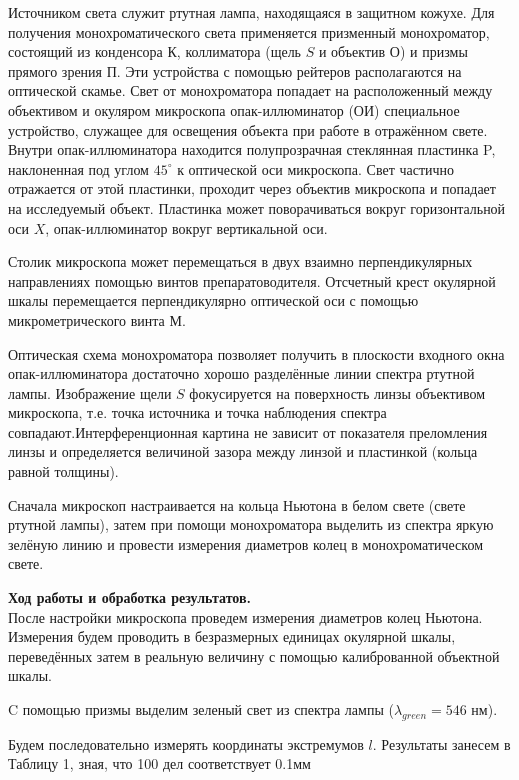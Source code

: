 \documentclass[a4paper, 12pt]{article}%
\begin{document}
Источником света служит ртутная лампа, находящаяся в защитном кожухе. Для получения монохроматического света применяется призменный монохроматор, состоящий из конденсора $ К $, коллиматора (щель $ S $ и объектив $ О $) и призмы прямого зрения $ П $. Эти устройства с помощью рейтеров располагаются на оптической скамье. Свет от монохроматора попадает на расположенный между объективом и окуляром микроскопа опак-иллюминатор (ОИ)  специальное устройство, служащее для освещения объекта при работе в отражённом свете. Внутри опак-иллюминатора находится полупрозрачная стеклянная пластинка P, наклоненная под углом $ 45^\circ $ к оптической оси микроскопа. Свет частично отражается от этой пластинки, проходит через объектив микроскопа и попадает на исследуемый объект. Пластинка может поворачиваться вокруг горизонтальной оси $ X $, опак-иллюминатор вокруг вертикальной оси.

Столик микроскопа может перемещаться в двух взаимно перпендикулярных направлениях помощью винтов препаратоводителя. Отсчетный крест окулярной шкалы перемещается перпендикулярно оптической оси с помощью микрометрического винта $ М $.

Оптическая схема монохроматора позволяет получить в плоскости входного окна опак-иллюминатора достаточно хорошо разделённые линии спектра ртутной лампы. Изображение щели $ S $ фокусируется на поверхность линзы объективом микроскопа, т.е. точка источника и точка наблюдения спектра совпадают.Интерференционная картина не зависит от показателя преломления линзы и определяется величиной зазора между линзой и пластинкой (кольца равной толщины).

Сначала микроскоп настраивается на кольца Ньютона в белом свете (свете ртутной лампы), затем при помощи монохроматора выделить из спектра яркую зелёную линию и провести измерения диаметров колец в монохроматическом свете. 

\newpage

	\textbf{Ход работы и обработка результатов.}\\
	

	После настройки микроскопа проведем измерения диаметров колец Ньютона. Измерения будем проводить в безразмерных единицах окулярной шкалы, переведённых затем в реальную величину с помощью калиброванной объектной шкалы. 


C помощью призмы выделим зеленый свет из спектра лампы ($ \lambda_{green} = 546 $ нм).

Будем последовательно измерять координаты экстремумов $ l $. Результаты занесем в Таблицу 1, зная, что 100 дел соответствует 0.1мм
\end{document}
